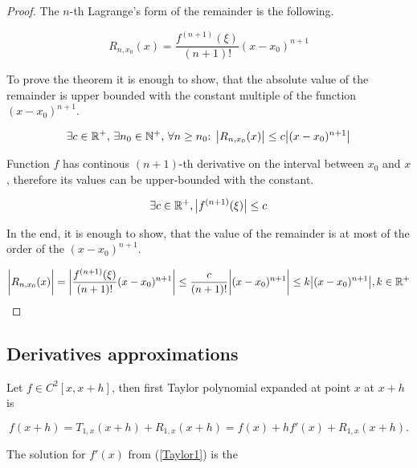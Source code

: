 \begin{proof}
 The \(n\)-th Lagrange's form of the remainder is the following.

 \begin{equation}
 R_{n,x_0}(x) = \frac{ f^{(n+1)}(\xi) } { (n + 1)! } (x-x_0)^{n + 1}
 \end{equation}

 To prove the theorem it is enough to show, that the absolute value of the remainder is upper bounded with the constant multiple of the function \((x - x_0)^{n+1}\).

 \begin{equation}
 \exists c \in \Bbb{R}^+ \text{, } \exists n_0 \in \Bbb{N}^+ \text{, } \forall n \ge n_0 \text{: } \big | R_{n, x_0}(x) \big | \le c \big | (x - x_0)^{n+1} \big |
 \end{equation}

 Function \(f\) has continous \((n+1)\)-th derivative on the interval between \(x_0\) and \(x\), therefore its values can be upper-bounded with the constant.

 \begin{equation}
 \exists c \in \Bbb{R}^+, \big | f^{(n+1)}(\xi) \big | \le c
 \end{equation}

 In the end, it is enough to show, that the value of the remainder is at most of the order of the \((x - x_0)^{n+1}\).

 \begin{equation}
 \bigg | R_{n,x_0}(x) \bigg | = \bigg | \frac{ f^{(n+1)}(\xi) } { (n + 1)! } (x-x_0)^{n + 1} \bigg | \le \frac{c}{(n+1)!} \bigg | (x-x_0)^{n + 1} \bigg | \le k \big | (x-x_0)^{n+1} \big |, k \in \Bbb{R}^+
 \end{equation}
\end{proof}

\subsection{Derivatives approximations} \label{sec:deriv-approx}

Let \(f \in C^2[x, x + h]\), then first Taylor polynomial expanded at point \(x\) at \(x + h\) is

\begin{equation} \label{Taylor1}
 f(x + h) = T_{1,x}(x + h) + R_{1, x}(x + h) = f(x) + h f'(x) + R_{1, x}(x + h).
\end{equation}

The solution for \(f'(x)\) from (\ref{Taylor1}) is the

